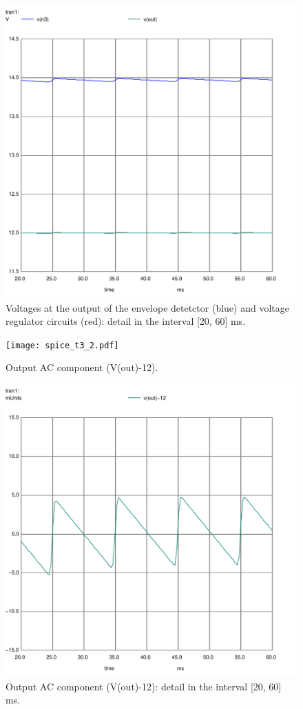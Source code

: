 \begin{figure}[h] \centering
  \includegraphics[scale=0.5]{Spice_t3_Zoom.pdf}
  \caption{Voltages at the output of the envelope detetctor (blue) and voltage regulator circuits (red): detail in the interval [20, 60] ms.}
  \label{fig:33}
\end{figure}

\begin{figure}[h] \centering
  \texttt{[image: spice\_t3\_2.pdf]}
  \caption{Output AC component (V(out)-12).}
  \label{fig:22}
\end{figure}

\begin{figure}[h] \centering
  \includegraphics[scale=0.5]{Spice_t3_2_Zoom.pdf}
  \caption{Output AC component (V(out)-12): detail in the interval [20, 60] ms.}
  \label{fig:44}
\end{figure}

